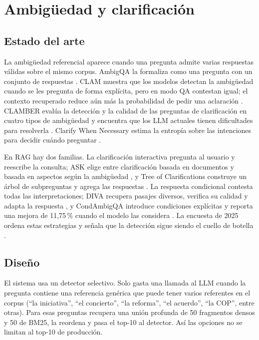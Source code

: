 \section{Ambig\"uedad y clarificaci\'on}
\label{sec:ambiguedad}

\subsection{Estado del arte}

La ambig\"uedad referencial aparece cuando una pregunta admite varias respuestas v\'alidas sobre el mismo corpus. AmbigQA la formaliza como una pregunta con un conjunto de respuestas \cite{min2020ambigqa}. CLAM muestra que los modelos detectan la ambig\"uedad cuando se les pregunta de forma expl\'icita, pero en modo QA contestan igual; el contexto recuperado reduce a\'un m\'as la probabilidad de pedir una aclaraci\'on \cite{kuhn2022clam}. CLAMBER eval\'ua la detecci\'on y la calidad de las preguntas de clarificaci\'on en cuatro tipos de ambig\"uedad y encuentra que los LLM actuales tienen dificultades para resolverla \cite{zhang2024clamber}. Clarify When Necessary estima la entrop\'ia sobre las intenciones para decidir cu\'ando preguntar \cite{zhang2025clarify}.

En RAG hay dos familias. La clarificaci\'on interactiva pregunta al usuario y reescribe la consulta; ASK elige entre clarificaci\'on basada en documentos y basada en aspectos seg\'un la ambig\"uedad \cite{sahay2025ask}, y Tree of Clarifications construye un \'arbol de subpreguntas y agrega las respuestas \cite{kim2023tree}. La respuesta condicional contesta todas las interpretaciones; DIVA recupera pasajes diversos, verifica su calidad y adapta la respuesta \cite{in2025diva}, y CondAmbigQA introduce condiciones expl\'icitas y reporta una mejora de 11,75\,\% cuando el modelo las considera \cite{li2025condambigqa}. La encuesta de 2025 ordena estas estrategias y se\~nala que la detecci\'on sigue siendo el cuello de botella \cite{tanjim2025survey}.

\subsection{Dise\~no}

El sistema usa un detector selectivo. Solo gasta una llamada al LLM cuando la pregunta contiene una referencia gen\'erica que puede tener varios referentes en el corpus (``la iniciativa'', ``el concierto'', ``la reforma'', ``el acuerdo'', ``la COP'', entre otras). Para esas preguntas recupera una uni\'on profunda de 50 fragmentos densos y 50 de BM25, la reordena y pasa el top-10 al detector. As\'i las opciones no se limitan al top-10 de producci\'on.

